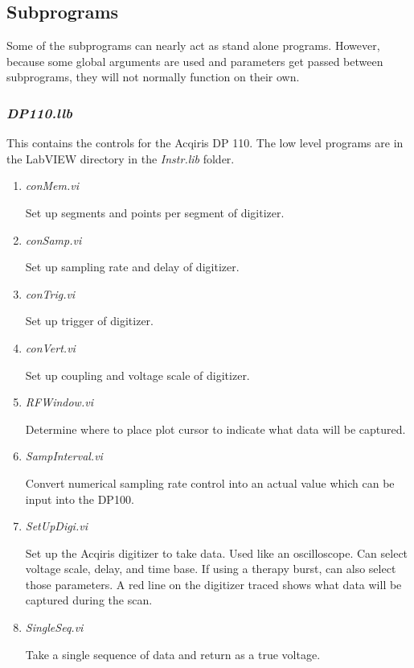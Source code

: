 \documentclass[10pt]{article}
\begin{document}
\subsection{Subprograms}

Some of the subprograms can nearly act as stand alone programs.
However, because some global arguments are used and parameters get
passed between subprograms, they will not normally function on
their own.


\subsubsection{{\it DP110.llb}}

This contains the controls for the Acqiris DP 110. The low level
programs are in the LabVIEW directory in the {\it Instr.lib}
folder.

\begin{enumerate}

\item {\it conMem.vi}

Set up segments and points per segment of digitizer.

\item {\it conSamp.vi}

Set up sampling rate and delay of digitizer.

\item {\it conTrig.vi}

Set up trigger of digitizer.

\item {\it conVert.vi}

Set up coupling and voltage scale of digitizer.

\item {\it RFWindow.vi}

Determine where to place plot cursor to indicate what data will be
captured.

\item {\it SampInterval.vi}

Convert numerical sampling rate control into an actual value which
can be input into the DP100.

\item {\it SetUpDigi.vi}

Set up the Acqiris digitizer  to take data. Used like an
oscilloscope. Can select voltage scale, delay, and time base. If
using a therapy burst, can also select those parameters. A red
line on the digitizer traced shows what data will be captured
during the scan.

\item {\it SingleSeq.vi}

Take a single sequence of data and return as a true voltage.

\end{enumerate}
\end{document}
